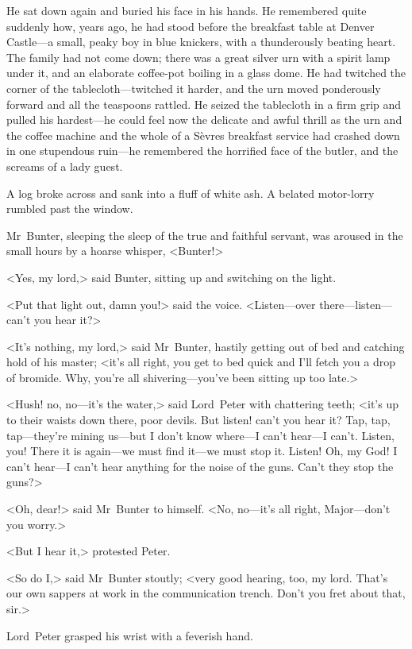 He sat down again and buried his face in his hands. He remembered quite suddenly how, years ago, he had stood before the breakfast table at Denver Castle—a small, peaky boy in blue knickers, with a thunderously beating heart. The family had not come down; there was a great silver urn with a spirit lamp under it, and an elaborate coffee-pot boiling in a glass dome. He had twitched the corner of the tablecloth—twitched it harder, and the urn moved ponderously forward and all the teaspoons rattled. He seized the tablecloth in a firm grip and pulled his hardest—he could feel now the delicate and awful thrill as the urn and the coffee machine and the whole of a Sèvres breakfast service had crashed down in one stupendous ruin—he remembered the horrified face of the butler, and the screams of a lady guest.

A log broke across and sank into a fluff of white ash. A belated motor-lorry rumbled past the window.

Mr~Bunter, sleeping the sleep of the true and faithful servant, was aroused in the small hours by a hoarse whisper, <Bunter!>

<Yes, my lord,> said Bunter, sitting up and switching on the light.

<Put that light out, damn you!> said the voice. <Listen—over there—listen—can't you hear it?>

<It's nothing, my lord,> said Mr~Bunter, hastily getting out of bed and catching hold of his master; <it's all right, you get to bed quick and I'll fetch you a drop of bromide. Why, you're all shivering—you've been sitting up too late.>

<Hush! no, no—it's the water,> said Lord~Peter with chattering teeth; <it's up to their waists down there, poor devils. But listen! can't you hear it? Tap, tap, tap—they're mining us—but I don't know where—I can't hear—I can't. Listen, you! There it is again—we must find it—we must stop it\textellipsis . Listen! Oh, my God! I can't hear—I can't hear anything for the noise of the guns. Can't they stop the guns?>

<Oh, dear!> said Mr~Bunter to himself. <No, no—it's all right, Major—don't you worry.>

<But I hear it,> protested Peter.

<So do I\@,> said Mr~Bunter stoutly; <very good hearing, too, my lord. That's our own sappers at work in the communication trench. Don't you fret about that, sir.>

Lord~Peter grasped his wrist with a feverish hand.

